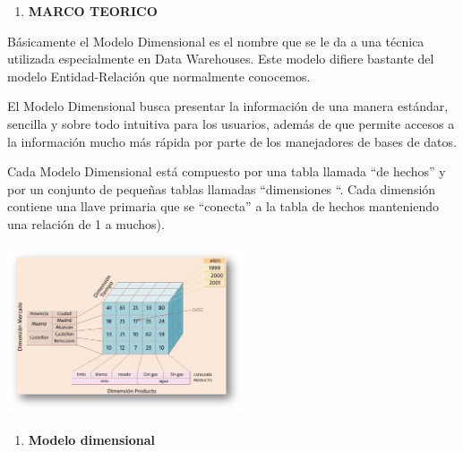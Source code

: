 \begin{center}
\noindent \textbf{}
\end{center}

\begin{enumerate}
\item  \textbf{MARCO TEORICO}
\end{enumerate}

\noindent \textbf{}

\noindent \textbf{\underbar{}}

\noindent B\'{a}sicamente el Modelo Dimensional es el nombre que se le da a una t\'{e}cnica utilizada especialmente en Data Warehouses. Este modelo difiere bastante del modelo Entidad-Relaci\'{o}n que normalmente conocemos.

\noindent 

\noindent El Modelo Dimensional busca presentar la informaci\'{o}n de una manera est\'{a}ndar, sencilla y sobre todo intuitiva para los usuarios, adem\'{a}s de que permite accesos a la informaci\'{o}n mucho m\'{a}s r\'{a}pida por parte de los manejadores de bases de datos.

\noindent 

\noindent Cada Modelo Dimensional est\'{a} compuesto por una tabla llamada ``de hechos'' y por un conjunto de peque\~{n}as tablas llamadas ``dimensiones ``. Cada dimensi\'{o}n contiene una llave primaria que se ``conecta'' a la tabla de hechos manteniendo una relaci\'{o}n de 1 a muchos).
\begin{center}
\includegraphics[width=7cm, height=5cm]{Imagenes/modelo_dimensional}
\end{center}
\begin{enumerate}
\item  \textbf{Modelo dimensional}

\end{enumerate}

\noindent 

